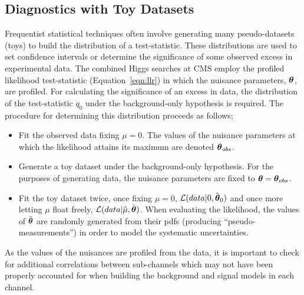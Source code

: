 \subsection{Diagnostics with Toy Datasets}
\label{sec:diagnostics}
Frequentist statistical techniques often involve generating many pseudo-datasets (toys)
 to build the distribution of a test-statistic. 
These distributions are used to set confidence intervals or determine the significance of
some observed excess in experimental data. The combined Higgs searches at CMS employ the
profiled likelihood test-statistic (Equation~\ref{eqn:llr}) in which the nuisance parameters,
${\boldsymbol{\theta}}$, are profiled. 
For calculating the significance of an excess in data, the distribution
of the test-statistic $q_{0}$ under the background-only hypothesis is required. 
The procedure for determining this distribution proceeds as follows;

\begin{itemize}
\item{Fit the observed data fixing $\mu=0$. The values of the nuisance parameters 
at which the likelihood attains its maximum are denoted ${\boldsymbol{\theta}}_{obs}$.}
\item{Generate a toy dataset under the background-only hypothesis. For the purposes of
generating data, the nuisance parameters are fixed to ${\boldsymbol{\theta}}={\boldsymbol{\theta}}_{obs}$.}
\item{Fit the toy dataset twice, once fixing $\mu=0$, $\mathcal{L}(data|0,\hat{{\boldsymbol{\theta}}}_{0})$ 
and once more letting 
$\mu$ float freely, $\mathcal{L}(data|\hat{\mu},\hat{{\boldsymbol{\theta}}})$. When 
evaluating the likelihood, the values of $\tilde{{\boldsymbol{\theta}}}$ are randomly generated from their pdfs
(producing ``pseudo-measurements'') in order to model the systematic uncertainties.}
\end{itemize}
As the values of the nuisances are profiled from the data, it is important to 
check for additional correlations between sub-channels which may not have 
been properly accounted for when building the background and signal models in
each channel.

